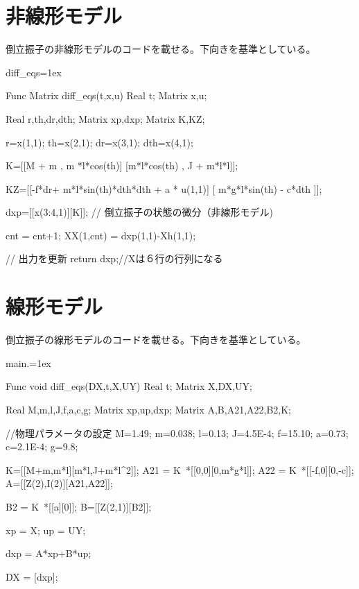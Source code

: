 \section{非線形モデル}
	倒立振子の非線形モデルのコードを載せる。下向きを基準としている。
	\begin{itembox}[l]{diff\_eqs}\baselineskip=1ex
		\begin{verbatimtab}[4]
Func Matrix diff_eqs(t,x,u)
Real t;
Matrix x,u;
{
	Real r,th,dr,dth;
	Matrix xp,dxp;
	Matrix K,KZ;

	r=x(1,1);
	th=x(2,1);
	dr=x(3,1);
	dth=x(4,1);

	K=[[M + m , m *l*cos(th)]
	   [m*l*cos(th) , J + m*l*l]];

	KZ=[[-f*dr+ m*l*sin(th)*dth*dth + a * u(1,1)]
		[ m*g*l*sin(th) - c*dth ]];
	
	dxp=[[x(3:4,1)][K\KZ]]; // 倒立振子の状態の微分（非線形モデル)

	cnt = cnt+1;
	XX(1,cnt) = dxp(1,1)-Xh(1,1);
	
	// 出力を更新
	return dxp;//Xは６行の行列になる
}
		\end{verbatimtab}
	\end{itembox}
\section{線形モデル}
	倒立振子の線形モデルのコードを載せる。下向きを基準としている。
	\begin{itembox}[l]{main.}\baselineskip=1ex
		\begin{verbatimtab}[4]
Func void diff_eqs(DX,t,X,UY)
Real t;
Matrix X,DX,UY;
{
	Real M,m,l,J,f,a,c,g;
	Matrix xp,up,dxp;
	Matrix A,B,A21,A22,B2,K;
	
	//物理パラメータの設定
	M=1.49;   m=0.038; l=0.13;
	J=4.5E-4; f=15.10; a=0.73;
	c=2.1E-4; g=9.8;
	
	K=[[M+m,m*l][m*l,J+m*l^2]];
	A21 = K~*[[0,0][0,m*g*l]];
	A22 = K~*[[-f,0][0,-c]];
	A=[[Z(2),I(2)][A21,A22]];
	
	B2 = K~*[[a][0]];
	B=[[Z(2,1)][B2]];
	
	xp = X;
	up = UY;
	
	dxp = A*xp+B*up;
	
	DX = [dxp];

}
		\end{verbatimtab}
	\end{itembox}
